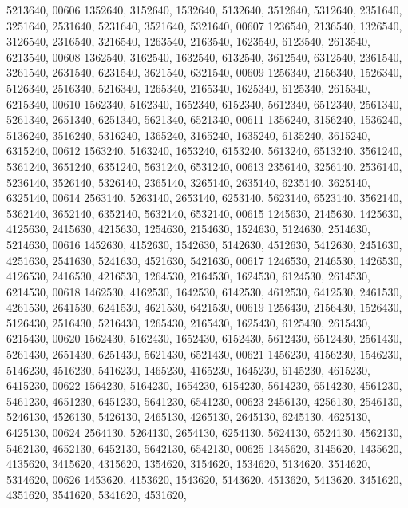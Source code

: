 \begin{DoxyCode}
      5213640,
00606       1352640, 3152640, 1532640, 5132640, 3512640, 5312640, 2351640, 3251640, 2531640, 5231640, 3521640, 
      5321640,
00607       1236540, 2136540, 1326540, 3126540, 2316540, 3216540, 1263540, 2163540, 1623540, 6123540, 2613540, 
      6213540,
00608       1362540, 3162540, 1632540, 6132540, 3612540, 6312540, 2361540, 3261540, 2631540, 6231540, 3621540, 
      6321540,
00609       1256340, 2156340, 1526340, 5126340, 2516340, 5216340, 1265340, 2165340, 1625340, 6125340, 2615340, 
      6215340,
00610       1562340, 5162340, 1652340, 6152340, 5612340, 6512340, 2561340, 5261340, 2651340, 6251340, 5621340, 
      6521340,
00611       1356240, 3156240, 1536240, 5136240, 3516240, 5316240, 1365240, 3165240, 1635240, 6135240, 3615240, 
      6315240,
00612       1563240, 5163240, 1653240, 6153240, 5613240, 6513240, 3561240, 5361240, 3651240, 6351240, 5631240, 
      6531240,
00613       2356140, 3256140, 2536140, 5236140, 3526140, 5326140, 2365140, 3265140, 2635140, 6235140, 3625140, 
      6325140,
00614       2563140, 5263140, 2653140, 6253140, 5623140, 6523140, 3562140, 5362140, 3652140, 6352140, 5632140, 
      6532140,
00615       1245630, 2145630, 1425630, 4125630, 2415630, 4215630, 1254630, 2154630, 1524630, 5124630, 2514630, 
      5214630,
00616       1452630, 4152630, 1542630, 5142630, 4512630, 5412630, 2451630, 4251630, 2541630, 5241630, 4521630, 
      5421630,
00617       1246530, 2146530, 1426530, 4126530, 2416530, 4216530, 1264530, 2164530, 1624530, 6124530, 2614530, 
      6214530,
00618       1462530, 4162530, 1642530, 6142530, 4612530, 6412530, 2461530, 4261530, 2641530, 6241530, 4621530, 
      6421530,
00619       1256430, 2156430, 1526430, 5126430, 2516430, 5216430, 1265430, 2165430, 1625430, 6125430, 2615430, 
      6215430,
00620       1562430, 5162430, 1652430, 6152430, 5612430, 6512430, 2561430, 5261430, 2651430, 6251430, 5621430, 
      6521430,
00621       1456230, 4156230, 1546230, 5146230, 4516230, 5416230, 1465230, 4165230, 1645230, 6145230, 4615230, 
      6415230,
00622       1564230, 5164230, 1654230, 6154230, 5614230, 6514230, 4561230, 5461230, 4651230, 6451230, 5641230, 
      6541230,
00623       2456130, 4256130, 2546130, 5246130, 4526130, 5426130, 2465130, 4265130, 2645130, 6245130, 4625130, 
      6425130,
00624       2564130, 5264130, 2654130, 6254130, 5624130, 6524130, 4562130, 5462130, 4652130, 6452130, 5642130, 
      6542130,
00625       1345620, 3145620, 1435620, 4135620, 3415620, 4315620, 1354620, 3154620, 1534620, 5134620, 3514620, 
      5314620,
00626       1453620, 4153620, 1543620, 5143620, 4513620, 5413620, 3451620, 4351620, 3541620, 5341620, 4531620, 

\end{DoxyCode}

